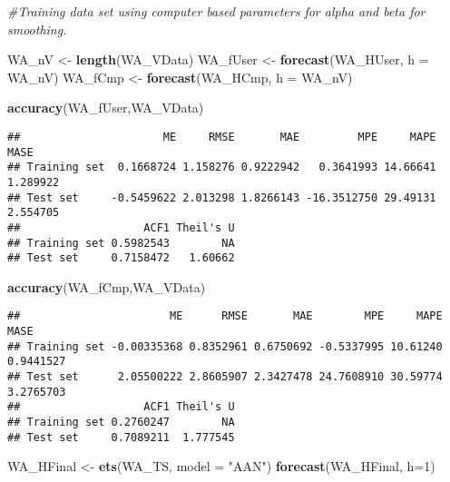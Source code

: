 \documentclass[
]{article}
\newenvironment{Shaded}{\begin{snugshade}}{\end{snugshade}}
\newcommand{\CommentTok}[1]{\textcolor[rgb]{0.56,0.35,0.01}{\textit{#1}}}
\newcommand{\DataTypeTok}[1]{\textcolor[rgb]{0.13,0.29,0.53}{#1}}
\newcommand{\DecValTok}[1]{\textcolor[rgb]{0.00,0.00,0.81}{#1}}
\newcommand{\KeywordTok}[1]{\textcolor[rgb]{0.13,0.29,0.53}{\textbf{#1}}}
\newcommand{\NormalTok}[1]{#1}
\newcommand{\StringTok}[1]{\textcolor[rgb]{0.31,0.60,0.02}{#1}}
\begin{document}
\begin{Shaded}
\begin{Highlighting}[]
\CommentTok{#Training data set using computer based parameters for alpha and beta for smoothing.}
\end{Highlighting}
\end{Shaded}

\begin{Shaded}
\begin{Highlighting}[]
\NormalTok{WA_nV <-}\StringTok{ }\KeywordTok{length}\NormalTok{(WA_VData)}
\NormalTok{WA_fUser <-}\StringTok{ }\KeywordTok{forecast}\NormalTok{(WA_HUser, }\DataTypeTok{h =}\NormalTok{ WA_nV)}
\NormalTok{WA_fCmp <-}\StringTok{ }\KeywordTok{forecast}\NormalTok{(WA_HCmp, }\DataTypeTok{h =}\NormalTok{ WA_nV)}
\end{Highlighting}
\end{Shaded}

\begin{Shaded}
\begin{Highlighting}[]
\KeywordTok{accuracy}\NormalTok{(WA_fUser,WA_VData)}
\end{Highlighting}
\end{Shaded}

\begin{verbatim}
##                      ME     RMSE       MAE         MPE     MAPE     MASE
## Training set  0.1668724 1.158276 0.9222942   0.3641993 14.66641 1.289922
## Test set     -0.5459622 2.013298 1.8266143 -16.3512750 29.49131 2.554705
##                   ACF1 Theil's U
## Training set 0.5982543        NA
## Test set     0.7158472   1.60662
\end{verbatim}

\begin{Shaded}
\begin{Highlighting}[]
\KeywordTok{accuracy}\NormalTok{(WA_fCmp,WA_VData)}
\end{Highlighting}
\end{Shaded}

\begin{verbatim}
##                       ME      RMSE       MAE        MPE     MAPE      MASE
## Training set -0.00335368 0.8352961 0.6750692 -0.5337995 10.61240 0.9441527
## Test set      2.05500222 2.8605907 2.3427478 24.7608910 30.59774 3.2765703
##                   ACF1 Theil's U
## Training set 0.2760247        NA
## Test set     0.7089211  1.777545
\end{verbatim}

\begin{Shaded}
\begin{Highlighting}[]
\NormalTok{WA_HFinal <-}\StringTok{ }\KeywordTok{ets}\NormalTok{(WA_TS, }\DataTypeTok{model =} \StringTok{"AAN"}\NormalTok{)}
\KeywordTok{forecast}\NormalTok{(WA_HFinal, }\DataTypeTok{h=}\DecValTok{1}\NormalTok{)}
\end{Highlighting}
\end{Shaded}
\end{document}
